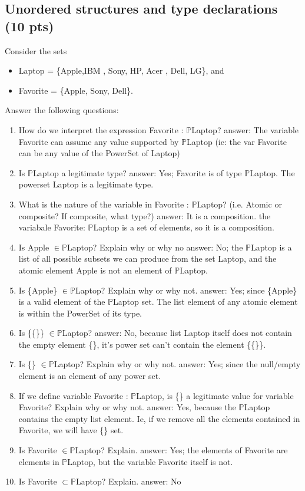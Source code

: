 \documentclass[12pt]{article}
\begin{document}
\subsection{Unordered structures and type declarations (10 pts)}
Consider the sets
\begin{itemize}
	\item Laptop = \{Apple,IBM , Sony, HP, Acer , Dell, LG\}, and
	\item Favorite = \{Apple, Sony, Dell\}.
\end{itemize}
Answer the following questions:
\begin{enumerate}
	\item How do we interpret the expression Favorite : $\mathbb{P}$Laptop?
	\subitem answer: 
	\subitem The variable Favorite can assume any value supported by $\mathbb{P}$Laptop (ie: the var Favorite can be any value of the PowerSet of Laptop)
	\item Is $\mathbb{P}$Laptop a legitimate type?
	\subitem answer: 
	\subitem Yes; Favorite is of type $\mathbb{P}$Laptop. The powerset Laptop is a legitimate type.
	\item What is the nature of the variable in Favorite : $\mathbb{P}$Laptop? (i.e. Atomic or composite? If composite, what type?)
	\subitem answer: 
	\subitem It is a composition. the variabale Favorite: $\mathbb{P}$Laptop is a set of elements, so it is a composition.
	\item Is Apple $\in \mathbb{P}$Laptop? Explain why or why no
	\subitem answer:
	\subitem No; the $\mathbb{P}$Laptop is a list of all possible subsets we can produce from the set Laptop, and the atomic element Apple is not an element of $\mathbb{P}$Laptop.
	\item Is \{Apple\} $\in \mathbb{P}$Laptop? Explain why or why not.
	\subitem answer:
	\subitem Yes; since \{Apple\} is a valid element of the $\mathbb{P}$Laptop set. The list element of any atomic element is within the PowerSet of its type.
	\item Is \{\{\}\} $\in \mathbb{P}$Laptop?
	\subitem answer:
	\subitem No, because list Laptop itself does not contain the empty element \{\}, it's power set can't contain the element \{\{\}\}.
	\item Is \{\} $\in \mathbb{P}$Laptop? Explain why or why not.
	\subitem answer:
	\subitem Yes; since the null/empty element is an element of any power set.
	\item If we define variable Favorite : $\mathbb{P}$Laptop, is \{\} a legitimate value for variable Favorite? Explain why or why not.
	\subitem answer:
	\subitem Yes, because the $\mathbb{P}$Laptop contains the empty list element. Ie, if we remove all the elements contained in Favorite, we will have \{\} set.
	\item Is Favorite $\in \mathbb{P}$Laptop? Explain.
	\subitem answer:
	\subitem Yes; the elements of Favorite are elements in $\mathbb{P}$Laptop, but the variable Favorite itself is not.
	\item Is Favorite $\subset \mathbb{P}$Laptop? Explain.
	\subitem answer:
	\subitem No
\end{enumerate}
\newpage
\end{document}
